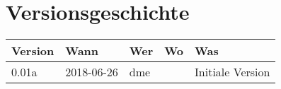 \section*{Versionsgeschichte}
\begin{tabularx}{\columnwidth}{l|l|l|l|X}
\hline
Version & Wann & Wer & Wo & Was \\
\hline
0.01a & 2018-06-26 & dme & & Initiale Version \\
\hline
\end{tabularx}
